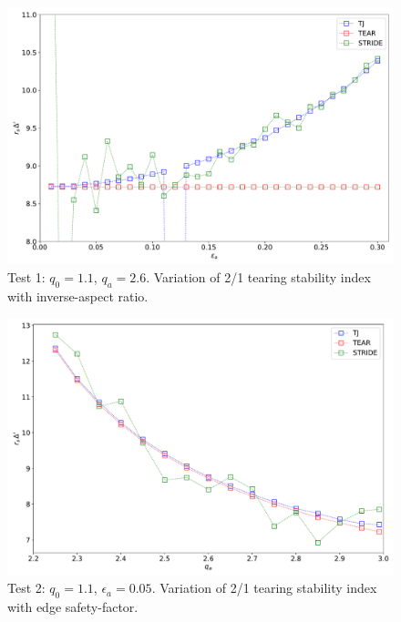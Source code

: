 \documentclass[12pt,prb,aps,notitlepage]{revtex4-1}
\begin{document}
\newpage
\begin{figure}
\centerline{\includegraphics[width=\textwidth]{Test1.pdf}}
\caption{Test 1: $q_0=1.1$, $q_a=2.6$. Variation of 2/1 tearing stability index with inverse-aspect ratio.}
\end{figure}

\begin{figure}
\centerline{\includegraphics[width=\textwidth]{Test2.pdf}}
\caption{Test 2: $q_0=1.1$, $\epsilon_a=0.05$. Variation of 2/1 tearing stability index with edge safety-factor.}
\end{figure}
\end{document}
